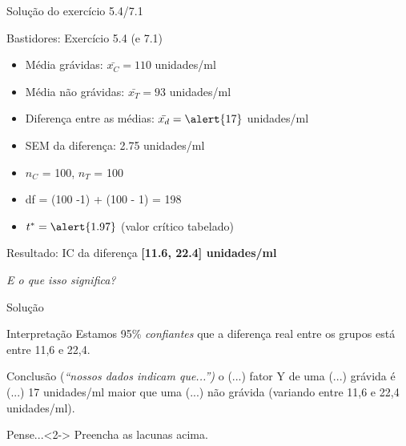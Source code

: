 \documentclass{beamer}
\begin{document}
\begin{frame}{\scriptsize Solução do exercício 5.4/7.1}
  \begin{exampleblock}{Bastidores: Exercício 5.4 (e 7.1)}
    \tiny
    \begin{itemize}
    \item Média grávidas: $\bar{x_C} = 110$ unidades/ml
    \item Média não grávidas: $\bar{x_T} = 93$ unidades/ml
    \item Diferença entre as médias: $\bar{x_d} = \alert{17}$ unidades/ml
    \item SEM da diferença: \alert{2.75} unidades/ml
    \item $n_C$ = 100, $n_T$ = 100
    \item df = (100 -1) + (100 - 1) = \alert{198}
    \item $t^{*} = \alert{1.97}$ {\tiny(valor crítico tabelado)}
    \end{itemize}
  \end{exampleblock}
  \begin{exampleblock}{Resultado: IC da diferença}
    \footnotesize
    \centering
    {\bf [11.6, 22.4] unidades/ml}
  \end{exampleblock}
  \begin{center}
    \scriptsize
    {\em E o que isso significa?}
  \end{center}
\end{frame}

\begin{frame}{\scriptsize Solução}
  \begin{exampleblock}{Interpretação}
    Estamos 95\% {\em confiantes} que a diferença \alert{real} entre os grupos está entre 11,6 e 22,4.
    \scriptsize
  \end{exampleblock}

  \bigskip
  \begin{exampleblock}{Conclusão {(\em ``nossos dados indicam que...'')}}
    \small
    o (...) fator Y de uma (...) grávida é (...) 17 unidades/ml maior que uma (...) não grávida (variando entre 11,6 e 22,4 unidades/ml).
  \end{exampleblock}
  \begin{block}{Pense...}<2->
    \scriptsize
    Preencha as lacunas acima.
  \end{block}
\end{frame}
\end{document}
